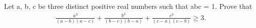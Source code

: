 \item Let a, b, c be three distinct positive real numbers such that abc = 1. Prove that 
\begin{align*}
\frac{a^3}{(a-b)(a-c)} + \frac{b^3}{(b-c)(b-a)} + \frac{c^3}{(c-a)(c-b)} \geq 3.
\end{align*}

